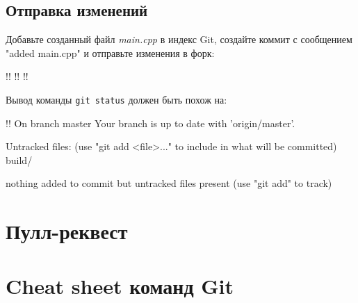 \documentclass[14pt]{extarticle}
\begin{document}
    \subsection{Отправка изменений}

    Добавьте созданный файл \textit{main.cpp} в индекс Git, создайте коммит
    с сообщением "added main.cpp" и отправьте изменения в форк:

    \begin{terminalwindow}
!!
!!
!!
    \end{terminalwindow}

    Вывод команды \verb|git status| должен быть похож на:

    \begin{terminalwindow}
!!
On branch master
Your branch is up to date with 'origin/master'.

Untracked files:
  (use "git add <file>..." to include in what will be committed)
        build/

nothing added to commit but untracked files present (use "git add" to track)
    \end{terminalwindow}

\section{Пулл-реквест}

\appendix

\section{Cheat sheet команд Git}
\end{document}
